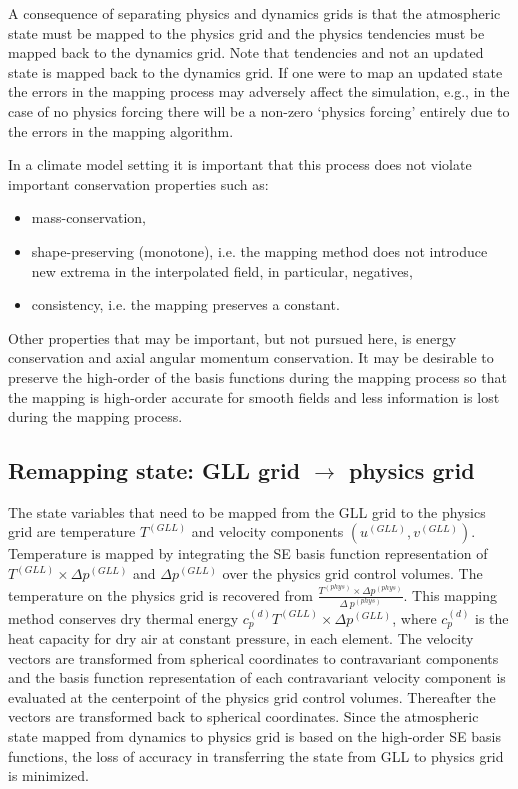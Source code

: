 A consequence of separating physics and dynamics grids is that the atmospheric state must be mapped to the physics grid and the physics tendencies must be mapped back to the dynamics grid. Note that tendencies and not an updated state is mapped back to the dynamics grid. If one were to map an updated state the errors in the mapping process may adversely affect the simulation, e.g., in the case of no physics forcing there will be a non-zero `physics forcing' entirely due to the errors in the mapping algorithm.

In a climate model setting it is important that this process does not violate important conservation properties such as:
\begin{itemize}
\item mass-conservation,
\item shape-preserving (monotone), i.e. the mapping method does not introduce new extrema in the interpolated field, in particular, negatives,
\item consistency, i.e. the mapping preserves a constant.
\end{itemize}
Other properties that may be important, but not pursued here, is energy conservation and axial angular momentum conservation. It may be desirable to preserve the high-order of the basis functions during the mapping process so that the mapping is high-order accurate for smooth fields and less information is lost during the mapping process. 

{\color{red}{
\begin{itemize}
\item description of PHIS
\end{itemize}
}}
\subsection{Remapping state: GLL grid $\rightarrow$ physics grid}
The state variables that need to be mapped from the GLL grid to the physics grid are temperature $T^{(GLL)}$ and velocity components  $(u^{(GLL)},v^{(GLL)})$. Temperature is mapped by integrating the SE basis function representation of $T^{(GLL)}\times \Delta p^{(GLL)}$ and $\Delta p^{(GLL)}$ over the physics grid control volumes. The temperature on the physics grid is recovered from $\frac{T^{(phys)}\times \Delta p^{(phys)}}{\Delta\ p^{(phys)}}$. This mapping method conserves dry thermal energy $c_p^{(d)}T^{(GLL)}\times \Delta p^{(GLL)}$, where $c_p^{(d)}$ is the heat capacity for dry air at constant pressure, in each element. The velocity vectors are transformed from spherical coordinates to contravariant components \citep[see, e.g., section 3.2 in ][]{LetAl2017MWR} and the basis function representation of each contravariant velocity component is evaluated at the centerpoint of the physics grid control volumes. Thereafter the vectors are transformed back to spherical coordinates. Since the atmospheric state mapped from dynamics to physics grid is based on the high-order SE basis functions, the loss of accuracy in transferring the state from GLL to physics grid is minimized.


